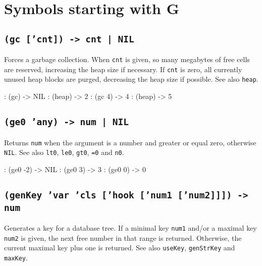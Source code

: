 %
%
%



\chapter{Symbols starting with G}
\label{sec:func-ref-G-}


 
\section*{\texttt{(gc ['cnt]) -> cnt | NIL}}
\label{sec:func-ref-G-(gc ['cnt]) -> cnt | NIL}


Forces a garbage collection. When \texttt{cnt} is given, so many megabytes of
free cells are reserved, increasing the heap size if necessary. If \texttt{cnt}
is zero, all currently unused heap blocks are purged, decreasing the
heap size if possible. See also \texttt{heap}.


\begin{wideverbatim}
: (gc)
-> NIL
: (heap)
-> 2
: (gc 4)
-> 4
: (heap)
-> 5
\end{wideverbatim}

 
\section*{\texttt{(ge0 'any) -> num | NIL}}
\label{sec:func-ref-G-(ge0 'any) -> num | NIL}


Returns \texttt{num} when the argument is a number and greater or equal zero,
otherwise \texttt{NIL}. See also \texttt{lt0}, \texttt{le0}, \texttt{gt0}, \texttt{=0} and \texttt{n0}.


\begin{wideverbatim}
: (ge0 -2)
-> NIL
: (ge0 3)
-> 3
: (ge0 0)
-> 0
\end{wideverbatim}

 
\section*{\texttt{(genKey 'var 'cls ['hook ['num1 ['num2]]]) -> num}}
\label{sec:func-ref-G-(genKey 'var 'cls ['hook ['num1 ['num2]]]) -> num}


Generates a key for a database tree. If a minimal key \texttt{num1} and/or a
maximal key \texttt{num2} is given, the next free number in that range is
returned. Otherwise, the current maximal key plus one is returned. See
also \texttt{useKey}, \texttt{genStrKey} and \texttt{maxKey}.


